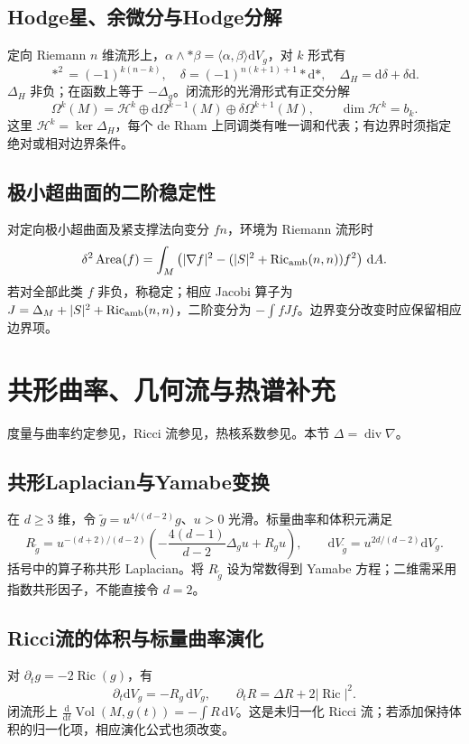 \documentclass[../main.tex]{subfiles}
\begin{document}
\subsection{Hodge星、余微分与Hodge分解}
定向 Riemann $n$ 维流形上，$\alpha\wedge*\beta=\langle\alpha,\beta\rangle\mathrm dV_g$，对 $k$ 形式有
\[
*^2=(-1)^{k(n-k)},\quad\delta=(-1)^{n(k+1)+1}*\mathrm d*,\quad
\Delta_H=\mathrm d\delta+\delta\mathrm d.
\]
$\Delta_H$ 非负；在函数上等于 $-\Delta_g$。闭流形的光滑形式有正交分解
\[
\Omega^k(M)=\mathcal H^k\oplus\mathrm d\Omega^{k-1}(M)\oplus\delta\Omega^{k+1}(M),\qquad
\dim\mathcal H^k=b_k.
\]
这里 $\mathcal H^k=\ker\Delta_H$，每个 de Rham 上同调类有唯一调和代表；有边界时须指定绝对或相对边界条件。
\subsection{极小超曲面的二阶稳定性}
对定向极小超曲面及紧支撑法向变分 $fn$，环境为 Riemann 流形时
\[
\delta^2\operatorname{Area}(f)=\int_M\left(|\nabla f|^2-(|S|^2+\operatorname{Ric}_{\rm amb}(n,n))f^2\right)\,\mathrm dA.
\]
若对全部此类 $f$ 非负，称稳定；相应 Jacobi 算子为 $J=\Delta_M+|S|^2+\operatorname{Ric}_{\rm amb}(n,n)$，二阶变分为 $-\int fJf$。边界变分改变时应保留相应边界项。

\section{共形曲率、几何流与热谱补充}
度量与曲率约定参见\cite{riemann}，Ricci 流参见\cite{topping}，热核系数参见\cite{heatkernels}。本节 $\Delta=\operatorname{div}\nabla$。
\subsection{共形Laplacian与Yamabe变换}
在 $d\ge3$ 维，令 $\widetilde g=u^{4/(d-2)}g$、$u>0$ 光滑。标量曲率和体积元满足
\[
R_{\widetilde g}=u^{-(d+2)/(d-2)}
\left(-\frac{4(d-1)}{d-2}\Delta_gu+R_gu\right),\qquad
\mathrm dV_{\widetilde g}=u^{2d/(d-2)}\mathrm dV_g.
\]
括号中的算子称共形 Laplacian。将 $R_{\widetilde g}$ 设为常数得到 Yamabe 方程；二维需采用指数共形因子，不能直接令 $d=2$。
\subsection{Ricci流的体积与标量曲率演化}
对 $\partial_tg=-2\operatorname{Ric}(g)$，有
\[
\partial_t\mathrm dV_g=-R_g\,\mathrm dV_g,\qquad
\partial_tR=\Delta R+2|\operatorname{Ric}|^2.
\]
闭流形上 $\frac{\mathrm d}{\mathrm dt}\operatorname{Vol}(M,g(t))=-\int R\,\mathrm dV$。这是未归一化 Ricci 流；若添加保持体积的归一化项，相应演化公式也须改变。
\end{document}
